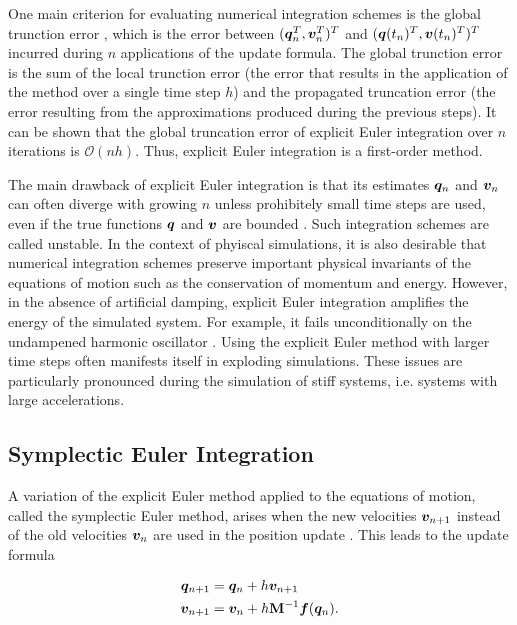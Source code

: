 One main criterion for evaluating numerical integration schemes is the global trunction error \cite{chapra2005}, which is the error between 
$(\bm{q}^T_n, \bm{v}^T_n)^T$ and $(\bm{q}(t_n)^T, \bm{v}(t_n)^T)^T$ incurred during $n$ applications of the update formula. The global 
trunction error is the sum 
of the local trunction error (the error that results in the application of the method over a single time step $h$) and the propagated truncation 
error (the error resulting from the approximations produced during the previous steps). It can be shown that the global truncation error of 
explicit Euler integration over $n$ iterations is $\mathcal{O}(nh)$. Thus, explicit Euler integration is a first-order method. 

The main drawback of explicit Euler integration is that its estimates $\bm{q}_n$ and $\bm{v}_n$ can often diverge with growing $n$ unless 
prohibitely small time steps are used, even if the true functions $\bm{q}$ and $\bm{v}$ are bounded \cite{chapra2005}. Such integration schemes 
are called unstable. In the context of phyiscal simulations, it is also desirable that numerical integration schemes preserve important physical 
invariants of the equations of motion such as the conservation of momentum and energy. However, in the absence of artificial damping, explicit
Euler integration amplifies the energy of the simulated system. For example, it fails unconditionally on the undampened harmonic oscillator 
\cite{servin2006}. Using the explicit Euler method with larger time steps often manifests itself in exploding
simulations. These issues are particularly pronounced during the simulation of stiff systems, i.e. systems with large accelerations.

\subsection{Symplectic Euler Integration}\label{ss:symplectic-euler}
A variation of the explicit Euler method applied to the equations of motion, called the symplectic Euler method, arises when the new 
velocities $\bm{v}_{n+1}$ instead of the old velocities $\bm{v}_n$ are used in the position update \cite{stern2006}. This leads to 
the update formula

\begin{align}
    \begin{split}\label{eq:symplectic-euler}
        \bm{q}_{n+1} &= \bm{q}_n + h\bm{v}_{n+1}\\
        \bm{v}_{n+1} &= \bm{v}_n + h\mathbf{M}^{-1}\bm{f}(\bm{q}_n).
    \end{split}
\end{align}

